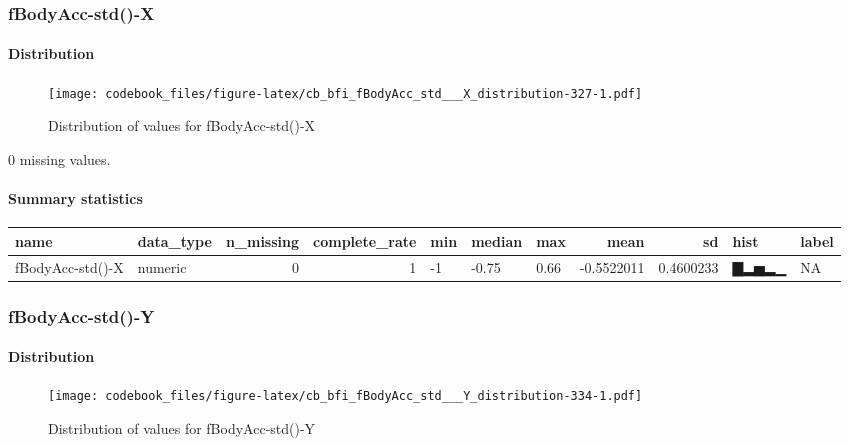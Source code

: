 \documentclass[
]{article}
\begin{document}
\hypertarget{fBodyAcc_std___X}{%
\subsubsection{fBodyAcc-std()-X}\label{fBodyAcc_std___X}}

\hypertarget{fBodyAcc_std___X_distribution}{%
\paragraph{Distribution}\label{fBodyAcc_std___X_distribution}}

\begin{figure}
\centering
\texttt{[image: codebook\_files/figure-latex/cb\_bfi\_fBodyAcc\_std\_\_\_X\_distribution-327-1.pdf]}
\caption{Distribution of values for fBodyAcc-std()-X}
\end{figure}

0 missing values.

\hypertarget{fBodyAcc_std___X_summary}{%
\paragraph{Summary statistics}\label{fBodyAcc_std___X_summary}}

\begin{longtable}[]{@{}llrrlllrrll@{}}
\toprule
name & data\_type & n\_missing & complete\_rate & min & median & max &
mean & sd & hist & label \\
\midrule
\endhead
fBodyAcc-std()-X & numeric & 0 & 1 & -1 & -0.75 & 0.66 & -0.5522011 &
0.4600233 & ▇▂▅▂▁ & NA \\
\bottomrule
\end{longtable}

\hypertarget{fBodyAcc_std___Y}{%
\subsubsection{fBodyAcc-std()-Y}\label{fBodyAcc_std___Y}}

\hypertarget{fBodyAcc_std___Y_distribution}{%
\paragraph{Distribution}\label{fBodyAcc_std___Y_distribution}}

\begin{figure}
\centering
\texttt{[image: codebook\_files/figure-latex/cb\_bfi\_fBodyAcc\_std\_\_\_Y\_distribution-334-1.pdf]}
\caption{Distribution of values for fBodyAcc-std()-Y}
\end{figure}
\end{document}
